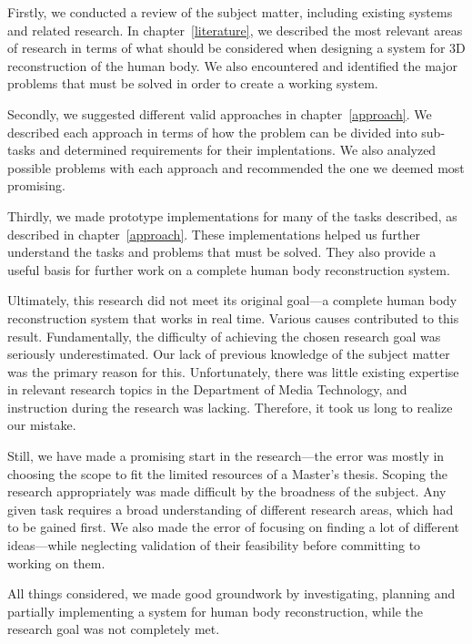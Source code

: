 Firstly, we conducted a review of the subject matter, including existing systems and related research. In chapter~\ref{literature}, we described the most relevant areas of research in terms of what should be considered when designing a system for 3D reconstruction of the human body. We also encountered and identified the major problems that must be solved in order to create a working system.

Secondly, we suggested different valid approaches in chapter~\ref{approach}. We described each approach in terms of how the problem can be divided into sub-tasks and determined requirements for their implentations. We also analyzed possible problems with each approach and recommended the one we deemed most promising.

Thirdly, we made prototype implementations for many of the tasks described, as described in chapter~\ref{approach}. These implementations helped us further understand the tasks and problems that must be solved. They also provide a useful basis for further work on a complete human body reconstruction system.

\newtopic

Ultimately, this research did not meet its original goal---a complete human body reconstruction system that works in real time. Various causes contributed to this result. Fundamentally, the difficulty of achieving the chosen research goal was seriously underestimated. Our lack of previous knowledge of the subject matter was the primary reason for this. Unfortunately, there was little existing expertise in relevant research topics in the Department of Media Technology, and instruction during the research was lacking. Therefore, it took us long to realize our mistake.

Still, we have made a promising start in the research---the error was mostly in choosing the scope to fit the limited resources of a Master's thesis. Scoping the research appropriately was made difficult by the broadness of the subject. Any given task requires a broad understanding of different research areas, which had to be gained first. We also made the error of focusing on finding a lot of different ideas---while neglecting validation of their feasibility before committing to working on them.

All things considered, we made good groundwork by investigating, planning and partially implementing a system for human body reconstruction, while the research goal was not completely met.
